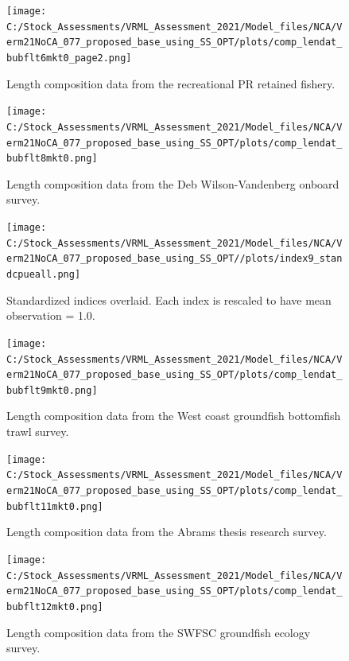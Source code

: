 \documentclass[
  english,
  a4paper,
]{article}
\begin{document}
\begin{figure}
\centering
\texttt{[image: C:/Stock\_Assessments/VRML\_Assessment\_2021/Model\_files/NCA/Verm21NoCA\_077\_proposed\_base\_using\_SS\_OPT/plots/comp\_lendat\_bubflt6mkt0\_page2.png]}
\caption{Length composition data from the recreational PR retained fishery.\label{fig:len-data-REC-PR}}
\end{figure}

\begin{figure}
\centering
\texttt{[image: C:/Stock\_Assessments/VRML\_Assessment\_2021/Model\_files/NCA/Verm21NoCA\_077\_proposed\_base\_using\_SS\_OPT/plots/comp\_lendat\_bubflt8mkt0.png]}
\caption{Length composition data from the Deb Wilson-Vandenberg onboard survey.\label{fig:len-data-DWV-ONBOARD}}
\end{figure}

\begin{figure}
\centering
\texttt{[image: C:/Stock\_Assessments/VRML\_Assessment\_2021/Model\_files/NCA/Verm21NoCA\_077\_proposed\_base\_using\_SS\_OPT//plots/index9\_standcpueall.png]}
\caption{Standardized indices overlaid. Each index is rescaled to have mean observation = 1.0.\label{fig:cpueall}}
\end{figure}

\begin{figure}
\centering
\texttt{[image: C:/Stock\_Assessments/VRML\_Assessment\_2021/Model\_files/NCA/Verm21NoCA\_077\_proposed\_base\_using\_SS\_OPT/plots/comp\_lendat\_bubflt9mkt0.png]}
\caption{Length composition data from the West coast groundfish bottomfish trawl survey.\label{fig:len-data-NWFSC-TWL}}
\end{figure}

\begin{figure}
\centering
\texttt{[image: C:/Stock\_Assessments/VRML\_Assessment\_2021/Model\_files/NCA/Verm21NoCA\_077\_proposed\_base\_using\_SS\_OPT/plots/comp\_lendat\_bubflt11mkt0.png]}
\caption{Length composition data from the Abrams thesis research survey.\label{fig:len-data-ABRAMS-RESEARCH}}
\end{figure}

\begin{figure}
\centering
\texttt{[image: C:/Stock\_Assessments/VRML\_Assessment\_2021/Model\_files/NCA/Verm21NoCA\_077\_proposed\_base\_using\_SS\_OPT/plots/comp\_lendat\_bubflt12mkt0.png]}
\caption{Length composition data from the SWFSC groundfish ecology survey.\label{fig:len-data-SWFSC-GF-ECOL}}
\end{figure}
\end{document}
